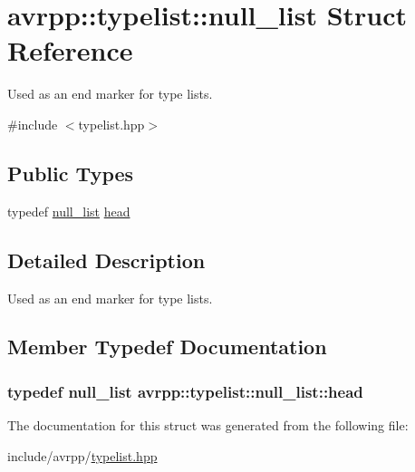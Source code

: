 \hypertarget{structavrpp_1_1typelist_1_1null__list}{
\section{avrpp::typelist::null\_\-list Struct Reference}
\label{structavrpp_1_1typelist_1_1null__list}
}


Used as an end marker for type lists.  




{\ttfamily \#include $<$typelist.hpp$>$}

\subsection*{Public Types}
\begin{DoxyCompactItemize}
\item 
typedef \hyperlink{structavrpp_1_1typelist_1_1null__list}{null\_\-list} \hyperlink{structavrpp_1_1typelist_1_1null__list_a69a9c53e74d292e9c2c6a571cb42b51e}{head}
\end{DoxyCompactItemize}


\subsection{Detailed Description}
Used as an end marker for type lists. 

\subsection{Member Typedef Documentation}
\hypertarget{structavrpp_1_1typelist_1_1null__list_a69a9c53e74d292e9c2c6a571cb42b51e}{
\subsubsection[{head}]{\setlength{\rightskip}{0pt plus 5cm}typedef {\bf null\_\-list} {\bf avrpp::typelist::null\_\-list::head}}}
\label{structavrpp_1_1typelist_1_1null__list_a69a9c53e74d292e9c2c6a571cb42b51e}


The documentation for this struct was generated from the following file:\begin{DoxyCompactItemize}
\item 
include/avrpp/\hyperlink{typelist_8hpp}{typelist.hpp}\end{DoxyCompactItemize}
